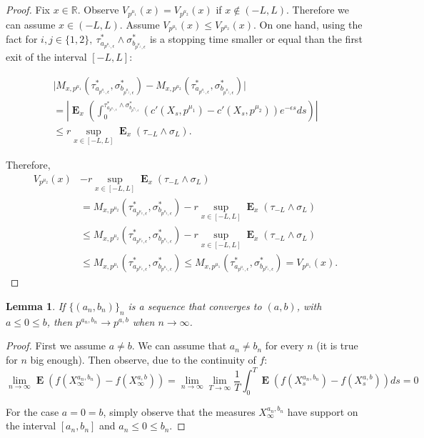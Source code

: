 \documentclass{article}
\newtheorem{lemma}[thm]{Lemma}
\newcommand\E{\operatorname{\mathbf{E}}}
\begin{document}
\begin{proof}
Fix $x \in \mathbb{R}$. Observe $V_{p^{\mu_1}}(x)=V_{p^{\mu_2}}(x)$ if $x \notin (-L,L)$. Therefore we can assume $x \in (-L,L)$. Assume $V_{p^{\mu_1}} (x) \leq V_{p^{\mu_2}}(x)$. On one hand, using the fact for $i,j \in  \lbrace 1,2 \rbrace, \ \tau^{\ast}_{a_{ p^{\mu_i},\epsilon}} \wedge \sigma^{\ast}_{b_{p^{\mu_j},\epsilon}}$ is a stopping time smaller or equal than the first exit of the interval $[-L,L]$:



\begin{multline}
\vert M_{x,p^{\mu_1}}(\tau^{\ast}_{a_{p^{\mu_i},\epsilon}},\sigma^{\ast}_{b_{p^{\mu_j},\epsilon}})- M_{x,p^{\mu_2}}(\tau^{\ast}_{a_{p^{\mu_i},\epsilon}},\sigma^{\ast}_{b_{p^{\mu_j},\epsilon}}) \vert \\
= \left\vert  \E_{x} \left( \int_0^{\tau^{\ast}_{a_{p^{\mu_i},\epsilon}}\wedge \sigma^{\ast}_{b_{p^{\mu_j},\epsilon}}}( c'(X_{s},p^{\mu_1})-c'(X_s,p^{\mu_2}))e^{-\epsilon s}ds  \right) \right\vert \\ \leq r \sup_{x \in [-L,L]}\E_x ( \tau_{-L} \wedge \sigma_L).
\end{multline}

Therefore, 
\begin{align*}
V_{p^{\mu_2}}(x) & -  r \sup_{x \in [-L,L]}\E_x ( \tau_{-L} \wedge \sigma_L)
\\& = M_{x,p^{\mu_2}}(\tau^{\ast}_{a_{p^{\mu_2},\epsilon}},\sigma^{\ast}_{b_{p^{\mu_2},\epsilon}}) -  r \sup_{x \in [-L,L]}\E_x ( \tau_{-L} \wedge \sigma_L) 
\\& \leq M_{x,p^{\mu_2}}(\tau^{\ast}_{a_{p^{\mu_2},\epsilon}},\sigma^{\ast}_{b_{p^{\mu_1},\epsilon}}) -  r \sup_{x \in [-L,L]}\E_x ( \tau_{-L} \wedge \sigma_L)
\\ & \leq  M_{x,p^{\mu_1}}(\tau^{\ast}_{a_{p^{\mu_2},\epsilon}},\sigma^{\ast}_{b_{p^{\mu_1},\epsilon}})  \leq  M_{x,p^{\mu_1}}(\tau^{\ast}_{a_{p^{\mu_1},\epsilon}},\sigma^{\ast}_{b_{p^{\mu_1},\epsilon}})  =V_{p^{\mu_1}}(x).  
\end{align*}
\end{proof}

\begin{lemma}\label{L:convergencetotalvariation}
If $\lbrace (a_n,b_n) \rbrace_n$ is a sequence that converges to $(a,b)$, with $a\leq 0 \leq b$, then $ p^{a_n,b_n} \rightarrow p^{a,b}$ when $n \to \infty$.
\end{lemma}
\begin{proof}
First we assume $a \neq b$. We can assume that $a_n \neq b_n$ for every $n$ (it is true for $n$ big enough).
 Then observe, due to the continuity of $f$:
\begin{equation*}
    \lim_{n \to \infty} \E \left(f(X_{\infty}^{a_n,b_n})-f(X_{\infty}^{a,b})  \right)=  \lim_{n \to \infty}\lim_{T \to \infty}\frac{1}{T} \int_0^T \E \left(f(X_{s}^{a_n,b_n})-f(X_{s}^{a,b} ) \right) ds=0
\end{equation*}
 
For the case $a=0=b$, simply observe that the measures $X^{a_n,b_n}_{\infty}$ have support on the interval $[a_n,b_n] $ and $a_n \leq 0 \leq b_n$.
\end{proof}
\end{document}
